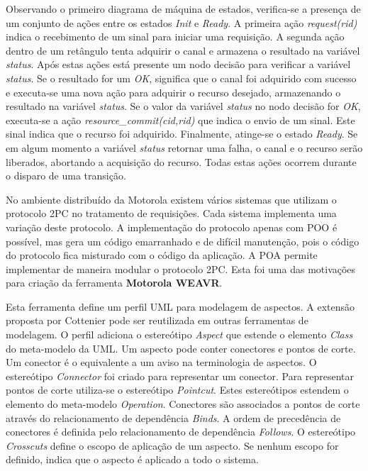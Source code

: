 Observando o primeiro diagrama de máquina de estados, verifica-se a presença de um conjunto de ações entre os estados \textit{Init} e \textit{Ready}. 
A primeira ação \textit{request(rid)} indica o recebimento de um sinal para iniciar uma requisição. A segunda ação dentro de um retângulo tenta
adquirir o canal e armazena o resultado na variável \textit{status}. Após estas ações está presente um nodo decisão para verificar a variável
\textit{status}. Se o resultado for um \textit{OK}, significa que o canal foi adquirido com sucesso e executa-se uma nova ação para adquirir o recurso
desejado, armazenando o resultado na variável \textit{status}. Se o valor da variável \textit{status} no nodo decisão for \textit{OK}, executa-se a
ação \textit{resource\_commit(cid,rid)} que indica o envio de um sinal. Este sinal indica que o recurso foi adquirido. Finalmente, atinge-se o estado
\textit{Ready}. Se em algum momento a variável \textit{status} retornar uma falha, o canal e o recurso serão liberados, abortando a acquisição do
recurso. Todas estas ações ocorrem durante o disparo de uma transição. 

No ambiente distribuído da Motorola existem vários sistemas que utilizam o protocolo 2PC no tratamento de requisições. Cada sistema implementa uma
variação deste protocolo. A implementação do protocolo apenas com POO é possível, mas gera um código emarranhado e de difícil manutenção, pois o
código do protocolo fica misturado com o código da aplicação. A POA permite implementar de maneira modular o protocolo 2PC. Esta foi uma das
motivações para criação da ferramenta \textbf{Motorola WEAVR}. 

Esta ferramenta define um perfil UML para modelagem de aspectos. A extensão proposta por Cottenier pode ser reutilizada em outras
ferramentas de modelagem. O perfil adiciona o estereótipo \textit{Aspect} que estende o elemento \textit{Class} do meta-modelo da UML. Um aspecto pode 
conter conectores e pontos de corte. Um conector é o equivalente a um aviso na terminologia de aspectos. O estereótipo
\textit{Connector} foi criado para representar um conector. Para representar pontos de corte utiliza-se o estereótipo \textit{Pointcut}. Estes
estereótipos estendem o elemento do meta-modelo \textit{Operation}. Conectores são associados a pontos de corte através do relacionamento de
dependência \textit{Binds}. A ordem de precedência de conectores é definida pelo relacionamento de dependência \textit{Follows}. O estereótipo
\textit{Crosscuts} define o escopo de aplicação de um aspecto. Se nenhum escopo for definido, indica que o aspecto é aplicado a todo o sistema.

